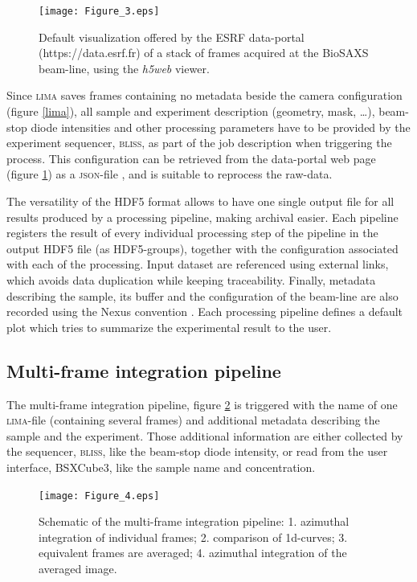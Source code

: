 \documentclass[preprint]{iucr}              %
\begin{document}
\begin{figure}
     \caption{Default visualization offered by the ESRF data-portal (https://data.esrf.fr) of a stack of frames acquired at the BioSAXS beam-line, using the \textit{h5web} viewer.}
     \texttt{[image: Figure\_3.eps]}
     \label{dataportal}
\end{figure}

Since \textsc{lima} saves frames containing no metadata beside the camera configuration (figure \ref{lima}), all sample and experiment description (geometry, mask, \ldots), beam-stop diode intensities and other processing parameters have to be provided by the experiment sequencer, \textsc{bliss}, as part of the job description when triggering the process. 
This configuration can be retrieved from the data-portal web page (figure \ref{dataportal}) as a \textsc{json}-file \cite{json}, and is suitable to reprocess the raw-data.

The versatility of the HDF5 format allows to have one single output file for all results produced by a processing pipeline, making archival easier.
Each pipeline registers the result of every individual processing step of the pipeline in the output HDF5 file (as HDF5-groups), together with the configuration associated with each of the processing.
Input dataset are referenced using external links, which avoids data duplication while keeping traceability. 
Finally, metadata describing the sample, its buffer and the configuration of the beam-line are also recorded using the Nexus convention \cite{nexus}.
Each processing pipeline defines a default plot which tries to summarize the experimental result to the user.

\subsection{Multi-frame integration pipeline}
\label{multiframe_pipeline}
The multi-frame integration pipeline, figure \ref{multiframe_worflow} is triggered with the name of one \textsc{lima}-file (containing several frames) and additional metadata describing the sample and the experiment.
Those additional information are either collected by the sequencer, \textsc{bliss}, like the beam-stop diode intensity, or read from the user interface, BSXCube3, like the sample name and concentration.

\begin{figure}
     \label{multiframe_worflow}
     \begin{center} 
     \caption{Schematic of the multi-frame integration pipeline: 
     1. azimuthal integration of individual frames; 
     2. comparison of 1d-curves;
     3. equivalent frames are averaged;
     4. azimuthal integration of the averaged image.}
     \texttt{[image: Figure\_4.eps]}
     \end{center}
\end{figure}
\end{document}
